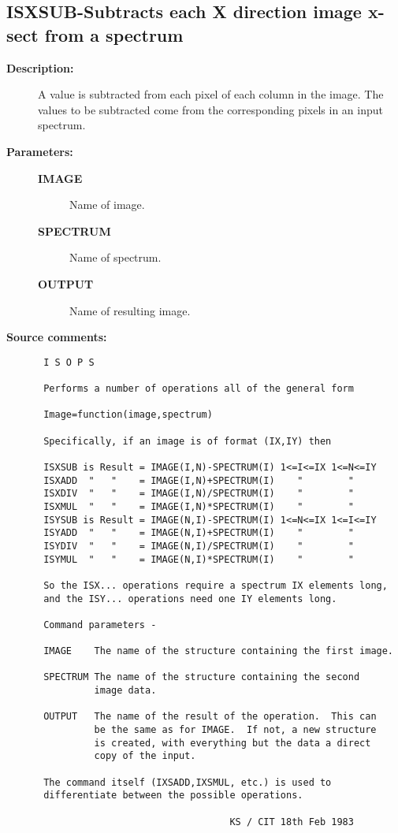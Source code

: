 \subsection{ISXSUB-\label{ISXSUB}Subtracts each X direction image x-sect from a spectrum}
\begin{description}

\item [{\bf Description:}]
 A value is subtracted from each pixel of each column in the image.
 The values to be subtracted come from the corresponding pixels in
 an input spectrum.

\item [{\bf Parameters:}]
\begin{description}
\item [{\bf IMAGE}]
 Name of image.
\item [{\bf SPECTRUM}]
 Name of spectrum.
\item [{\bf OUTPUT}]
 Name of resulting image.
\end{description}

\item [{\bf Source comments:}]
\begin{verbatim}
 I S O P S

 Performs a number of operations all of the general form

 Image=function(image,spectrum)

 Specifically, if an image is of format (IX,IY) then

 ISXSUB is Result = IMAGE(I,N)-SPECTRUM(I) 1<=I<=IX 1<=N<=IY
 ISXADD  "   "    = IMAGE(I,N)+SPECTRUM(I)    "        "
 ISXDIV  "   "    = IMAGE(I,N)/SPECTRUM(I)    "        "
 ISXMUL  "   "    = IMAGE(I,N)*SPECTRUM(I)    "        "
 ISYSUB is Result = IMAGE(N,I)-SPECTRUM(I) 1<=N<=IX 1<=I<=IY
 ISYADD  "   "    = IMAGE(N,I)+SPECTRUM(I)    "        "
 ISYDIV  "   "    = IMAGE(N,I)/SPECTRUM(I)    "        "
 ISYMUL  "   "    = IMAGE(N,I)*SPECTRUM(I)    "        "

 So the ISX... operations require a spectrum IX elements long,
 and the ISY... operations need one IY elements long.

 Command parameters -

 IMAGE    The name of the structure containing the first image.

 SPECTRUM The name of the structure containing the second
          image data.

 OUTPUT   The name of the result of the operation.  This can
          be the same as for IMAGE.  If not, a new structure
          is created, with everything but the data a direct
          copy of the input.

 The command itself (IXSADD,IXSMUL, etc.) is used to
 differentiate between the possible operations.

                                  KS / CIT 18th Feb 1983
\end{verbatim}
\end{description}
